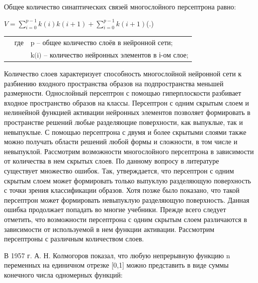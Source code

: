 {	
	
	
	
	\par \redline Общее количество синаптических связей многослойного персептрона равно:
	
	\formulaspace \par \redline 
	$V = \sum \limits _{i=0}^{p-1} k(i)k(i+1) + \sum \limits _{i=0}^{p-1} k(i+1)$\hfill (\thechaptercntr .\theformulacntr) \redline
	\formulaspace \addtocounter{formulacntr}{1}
	
	\begin{tabular}{p{}p{}p{}}
		& где  & $\textrm{p}$ {--} общее количество слоёв в нейронной сети; \\
		&      & $\textrm{k(i)}$ {--} количество нейронных элементов в і-ом слое; \\
		\end{tabular}
	
	\par \redline  Количество слоев характеризует способность многослойной нейронной сети к разбиению входного пространства образов на подпространства меньшей размерности. Однослойный персептрон с помощью гиперплоскости разбивает входное пространство образов на классы. Персептрон с одним скрытым слоем и
	нелинейной функцией активации нейронных элементов позволяет формировать в пространстве решений любые разделяющие поверхности, как выпуклые, так и невыпуклые. С помощью персептрона с двумя и более скрытыми слоями также можно получать области решений любой формы и сложности, в том числе и невыпуклой. Рассмотрим возможности многослойного персептрона в зависимости от количества в нем скрытых слоев. По данному вопросу в литературе существует множество ошибок. Так, утверждается, что персептрон с одним скрытым слоем может формировать только выпуклую разделяющую поверхность с точки зрения классификации образов. Хотя позже было показано, что такой персептрон может формировать невыпуклую разделяющую поверхность. Данная ошибка продолжает попадать во многие учебники. Прежде всего следует отметить, что возможности персептрона с одним скрытым слоем различаются в зависимости от используемой в нем функции активации. Рассмотрим персептроны с различным количеством слоев.
	
	\par \redline В 1957 г. А. Н. Колмогоров показал, что любую непрерывную функцию \textrm{n} переменных на единичном отрезке \textrm{[0,1]} можно представить в виде суммы конечного числа одномерных функций: 
	
}
